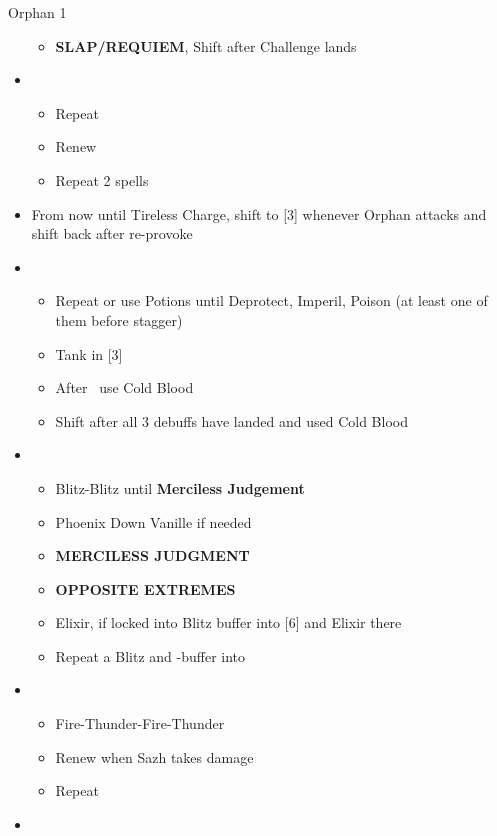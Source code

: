 \begin{battle}[3:00]{Orphan 1}
\begin{itemize}
			      \begin{itemize}
				      \item \textbf{SLAP/REQUIEM}, Shift after Challenge lands
			      \end{itemize}
			\item \fifth
			      \begin{itemize}
				      \item Repeat
				      \item Renew
				      \item Repeat 2 spells
			      \end{itemize}
			\item From now until Tireless Charge, shift to [3] whenever Orphan attacks and shift back after re-provoke
			\item \fifth
			      \begin{itemize}
				      \item Repeat or use Potions until Deprotect, Imperil, Poison (at least one of them before stagger)
				      \item Tank in [3]
				      \item After \stagger\ use Cold Blood
				      \item Shift after all 3 debuffs have landed and used Cold Blood
			      \end{itemize}
			\item \first
			      \begin{itemize}
				      \item Blitz-Blitz until \textbf{Merciless Judgement}
				      \item Phoenix Down Vanille if needed
				      \item \textbf{MERCILESS JUDGMENT}
				      \item \textbf{OPPOSITE EXTREMES}
				      \item Elixir, if locked into Blitz buffer into [6] and Elixir there
				      \item Repeat a Blitz and \rav-buffer into
			      \end{itemize}
			\item \sixth
			      \begin{itemize}
				      \item Fire-Thunder-Fire-Thunder
				      \item Renew when Sazh takes damage
				      \item Repeat
			      \end{itemize}
			\item \first
			      \begin{itemize}

\end{itemize}
\end{itemize}
\end{battle}
